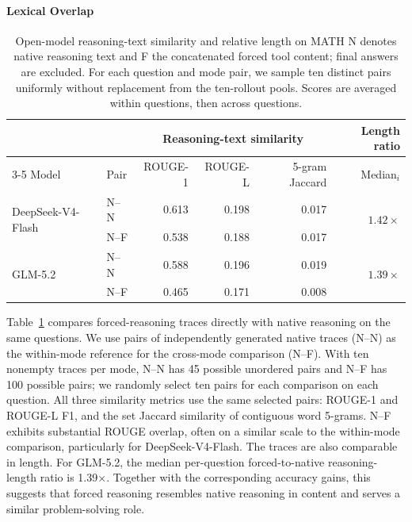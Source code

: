 \paragraph{Lexical Overlap} 
\begin{table}[ht]
\centering
\caption{Open-model reasoning-text similarity and relative length on MATH
N denotes native reasoning text and F the concatenated forced tool content; final answers are excluded.
For each question and mode pair, we sample ten distinct pairs uniformly without replacement from the ten-rollout pools.
Scores are averaged within questions, then across questions.}

\label{tab:trace-similarity}
\scriptsize
\setlength{\tabcolsep}{4pt}
\begin{tabular}{llrrrr}
\toprule
 & & \multicolumn{3}{c}{Reasoning-text similarity} & Length ratio \\
\cmidrule(lr){3-5}
Model & Pair & ROUGE-1 & ROUGE-L & 5-gram Jaccard & Median$_i$ \\
\midrule
\multirow{2}{*}{DeepSeek-V4-Flash} & N--N & 0.613 & 0.198 & 0.017 & \multirow{2}{*}{$1.42\times$} \\
 & N--F & 0.538 & 0.188 & 0.017 &  \\
\midrule
\multirow{2}{*}{GLM-5.2} & N--N & 0.588 & 0.196 & 0.019 & \multirow{2}{*}{$1.39\times$} \\
 & N--F & 0.465 & 0.171 & 0.008 &  \\
\bottomrule
\end{tabular}
\end{table}

Table~\ref{tab:trace-similarity} compares forced-reasoning traces directly with native reasoning on the same questions.
We use pairs of independently generated native traces (N--N) as the within-mode reference for the cross-mode comparison (N--F).
With ten nonempty traces per mode, N--N has 45 possible unordered pairs and N--F has 100 possible pairs; we randomly select ten pairs for each comparison on each question.
All three similarity metrics use the same selected pairs: ROUGE-1 and ROUGE-L F1, and the set Jaccard similarity of contiguous word 5-grams.
N--F exhibits substantial ROUGE overlap, often on a similar scale to the within-mode comparison, particularly for DeepSeek-V4-Flash.
The traces are also comparable in length.
For GLM-5.2, the median per-question forced-to-native reasoning-length ratio is 1.39$\times$.
Together with the corresponding accuracy gains, this suggests that forced reasoning resembles native reasoning in content and serves a similar problem-solving role.

